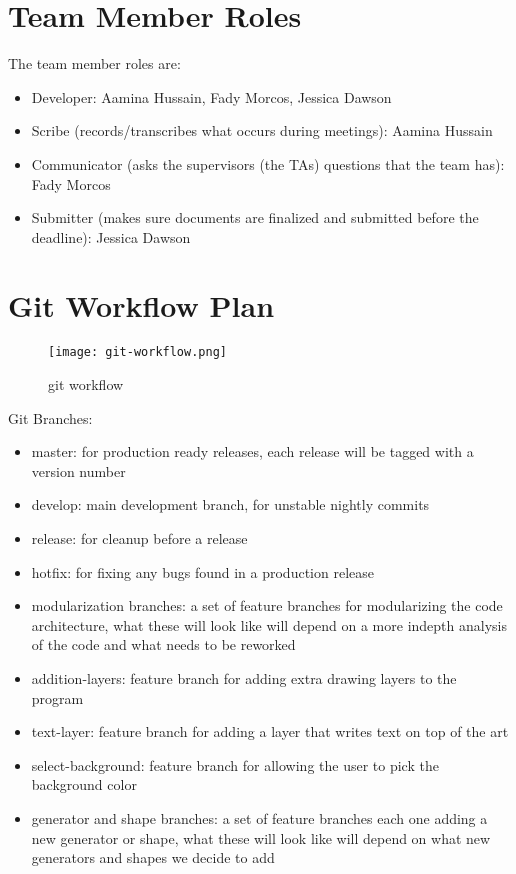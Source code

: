\documentclass{article}
\begin{document}
\section{Team Member Roles}

The team member roles are:
\begin{itemize}
    \item Developer: Aamina Hussain, Fady Morcos, Jessica Dawson
    \item Scribe (records/transcribes what occurs during meetings): Aamina Hussain
    \item Communicator (asks the supervisors (the TAs) questions that the team has): Fady Morcos
    \item Submitter (makes sure documents are finalized and submitted before the deadline): Jessica Dawson
\end{itemize}

\section{Git Workflow Plan}

\begin{figure}[H]
    \centering
    \texttt{[image: git-workflow.png]}
    \caption{git workflow}
\end{figure}

Git Branches:

\begin{itemize}
    \item master: for production ready releases, each release will be tagged with a version number
    \item develop: main development branch, for unstable nightly commits
    \item release: for cleanup before a release
    \item hotfix: for fixing any bugs found in a production release
    \item modularization branches: a set of feature branches for modularizing the code architecture, what these will look like will depend on a more indepth analysis of the code and what needs to be reworked
    \item addition-layers: feature branch for adding extra drawing layers to the program
    \item text-layer: feature branch for adding a layer that writes text on top of the art
    \item select-background: feature branch for allowing the user to pick the background color
    \item generator and shape branches: a set of feature branches each one adding a new generator or shape, what these will look like will depend on what new generators and shapes we decide to add
\end{itemize}
\end{document}
